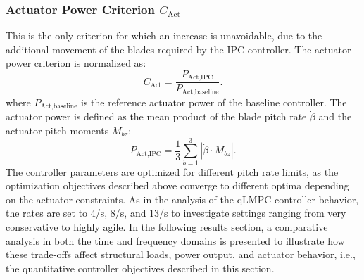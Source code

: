 \subsubsection*{Actuator Power Criterion $C_{\text{Act}}$}
This is the only criterion for which an increase is unavoidable, due to the additional movement of the blades required by the IPC controller. The actuator power criterion is normalized as:
\begin{equation} \label{eq:CAct}
    C_{\text{Act}} = \frac{P_{\text{Act}, \text{IPC}}}{P_{\text{Act}, \text{baseline}}}.
\end{equation}
where \( P_{\text{Act}, \text{baseline}} \) is the reference actuator power of the baseline controller. The actuator power is defined as the mean product of the blade pitch rate $\dot{\beta}$ and the actuator pitch moments $M_{bz}$:
\begin{equation} \label{eq:CAct_calc}
    P_{\text{Act}, \text{IPC}} = \frac{1}{3} \sum_{b=1}^3 \overline{|\dot{\beta} \cdot M_{bz}|}.
\end{equation}
The controller parameters are optimized for different pitch rate limits, as the optimization objectives described above converge to different optima depending on the actuator constraints. As in the analysis of the qLMPC controller behavior, the rates are set to 4\textdegree/s, 8\textdegree/s, and 13\textdegree/s to investigate settings ranging from very conservative to highly agile. In the following results section, a comparative analysis in both the time and frequency domains is presented to illustrate how these trade-offs affect structural loads, power output, and actuator behavior, i.e., the quantitative controller objectives described in this section.

